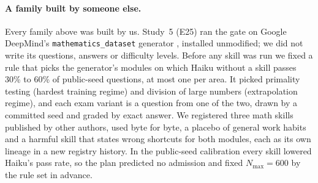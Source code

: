 \paragraph{A family built by someone else.} Every family above was built by us. Study~5 (E25) ran the gate on Google DeepMind's \texttt{mathematics\_dataset} generator \citep{saxton2019analysing}, installed unmodified; we did not write its questions, answers or difficulty levels. Before any skill was run we fixed a rule that picks the generator's modules on which Haiku without a skill passes 30\% to 60\% of public-seed questions, at most one per area. It picked primality testing (hardest training regime) and division of large numbers (extrapolation regime), and each exam variant is a question from one of the two, drawn by a committed seed and graded by exact answer. We registered three math skills published by other authors, used byte for byte, a placebo of general work habits and a harmful skill that states wrong shortcuts for both modules, each as its own lineage in a new registry history. In the public-seed calibration every skill lowered Haiku's pass rate, so the plan predicted no admission and fixed $N_{\max}=600$ by the rule set in advance.


